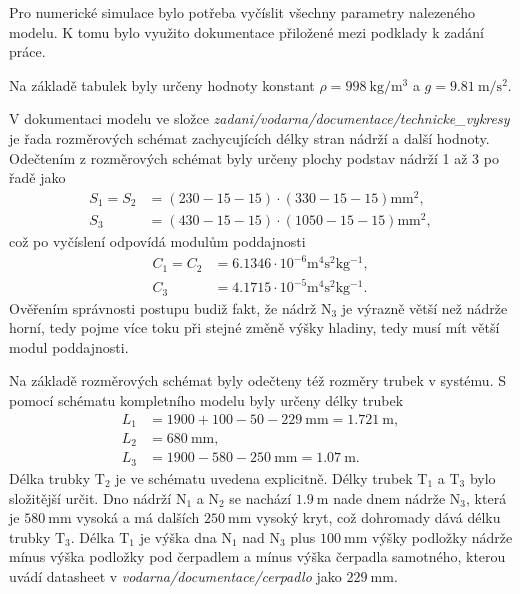 \documentclass[twoside]{article}
\begin{document}
Pro numerické simulace bylo potřeba vyčíslit všechny parametry nalezeného modelu.
K tomu bylo využito dokumentace přiložené mezi podklady k zadání práce.

Na základě tabulek \cite{tabulky} byly určeny hodnoty konstant $\rho = 998~\si{\kilogram\per\metre\cubed}$ a $g=9.81~\si{\metre\per\second\squared}$.

V dokumentaci modelu ve složce \textit{zadani/vodarna/documentace/technicke\_vykresy}
je řada rozměrových schémat zachycujících délky stran nádrží a další hodnoty. Odečtením z rozměrových schémat
byly určeny plochy podstav nádrží 1 až 3 po řadě jako
\begin{equation}
    \begin{split}
        S_1 = S_2 &= (230-15-15)\cdot(330-15-15) \si{\milli\metre\squared}, \\
        S_3 &= (430-15-15)\cdot(1050-15-15) \si{\milli\metre\squared},
    \end{split}
\end{equation}
což po vyčíslení odpovídá modulům poddajnosti
\begin{equation}
    \begin{split}        
        C_1 = C_2 &= 6.1346 \cdot 10^{-6} \si{\metre^4 \second^2\kg^{-1}}, \\
        C_3 &= 4.1715 \cdot 10^{-5}\si{\metre^4 \second^2\kg^{-1}}.
    \end{split}
\end{equation}
Ověřením správnosti postupu budiž fakt, že nádrž $\text{N}_3$ je výrazně větší než nádrže horní,
tedy pojme více toku při stejné změně výšky hladiny, tedy musí mít větší modul poddajnosti.

Na základě rozměrových schémat byly odečteny též rozměry trubek v systému.
S pomocí schématu kompletního modelu byly určeny délky trubek
\begin{equation}
    \begin{split}
        L_1 &= 1900+100-50-229~\si{\milli\metre} = 1.721~\si{\metre},\\
        L_2 &= 680~\si{\milli\metre},\\
        L_3 &= 1900-580-250~\si{\milli\metre}= 1.07~\si{\metre}.
    \end{split}
\end{equation}
Délka trubky $\text{T}_2$ je ve schématu uvedena explicitně. Délky trubek $\text{T}_1$ a $\text{T}_3$ bylo
složitější určit. Dno nádrží $\text{N}_1$ a $\text{N}_2$ se nachází $1.9~\si{\metre}$ nade dnem nádrže $\text{N}_3$,
která je $580~\si{\milli\metre}$ vysoká a má dalších $250~\si{\milli\metre}$ vysoký kryt, což dohromady dává délku trubky $\text{T}_3$.
Délka $\text{T}_1$ je výška dna $\text{N}_1$ nad $\text{N}_3$ plus $100~\si{\milli\metre}$ výšky podložky nádrže mínus výška
podložky pod čerpadlem a mínus výška čerpadla samotného, kterou uvádí datasheet v \textit{vodarna/documentace/cerpadlo} jako $229~\si{\milli\metre}$.
\end{document}
